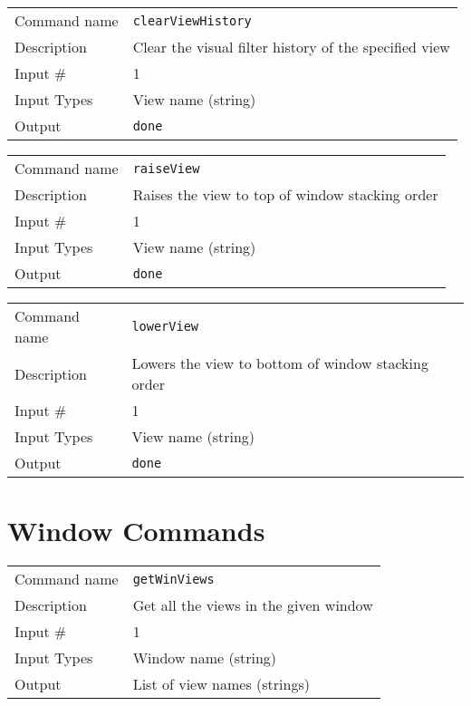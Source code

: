 \bigskip

\noindent
\begin{tabular}{l|p{5in}}
\hline
Command name & {\tt clearViewHistory} \\
Description  & Clear the visual filter history of the specified view \\
Input \#     & 1 \\
Input Types  & View name (string) \\
Output       & {\tt done} \\
\hline
\end{tabular}

\bigskip

\noindent
\begin{tabular}{l|p{5in}}
\hline
Command name & {\tt raiseView} \\
Description  & Raises the view to top of window stacking order \\
Input \#     & 1 \\
Input Types  & View name (string) \\
Output       & {\tt done} \\
\hline
\end{tabular}

\bigskip

\noindent
\begin{tabular}{l|p{5in}}
\hline
Command name & {\tt lowerView} \\
Description  & Lowers the view to bottom of window stacking order \\
Input \#     & 1 \\
Input Types  & View name (string) \\
Output       & {\tt done} \\
\hline
\end{tabular}

\section{Window Commands}

\noindent
\begin{tabular}{l|p{5in}}
\hline
Command name & {\tt getWinViews} \\
Description  & Get all the views in the given window \\
Input \#     & 1 \\
Input Types  & Window name (string) \\
Output       & List of view names (strings) \\
\hline
\end{tabular}

